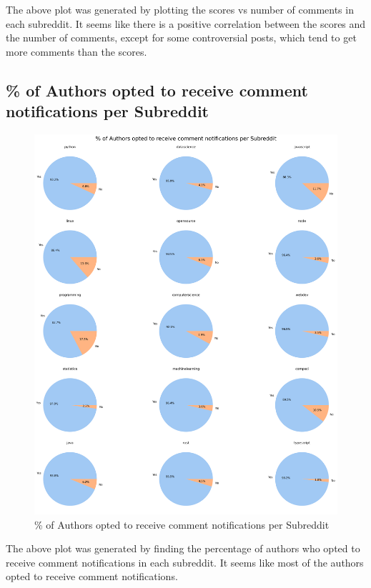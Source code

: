 \documentclass[12pt, letterpage]{article}
\begin{document}
The above plot was generated by plotting the scores vs number of comments in each subreddit. It seems like there is a positive correlation between the scores and the number of comments, except for some controversial posts, which tend to get more comments than the scores.

\subsection*{\% of Authors opted to receive comment notifications per Subreddit}

\begin{figure}[H]
    \centering
    \includegraphics[width=1\textwidth]{pie_comments.png}
    \caption{\% of Authors opted to receive comment notifications per Subreddit}
    \label{fig:comment_notifications}
\end{figure}

The above plot was generated by finding the percentage of authors who opted to receive comment notifications in each subreddit. It seems like most of the authors opted to receive comment notifications.
\end{document}
